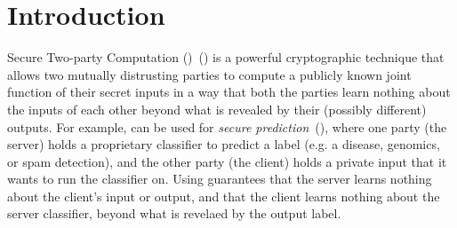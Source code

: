   
  

\section{Introduction}
\label{sec:intro}





Secure Two-party Computation (\mpc)~(\cite{yao,gmw}) is a powerful
cryptographic technique that allows two mutually distrusting parties
to compute a publicly known joint function of their secret inputs in a way that both
the parties learn nothing about the inputs of each other beyond what
is revealed by their (possibly different) outputs. For example, \mpc
can be used for {\em secure
prediction}~(\cite{shafindss,wu,barni,minionn,secureml}),
where one party (the server) holds a proprietary classifier to predict
a label (e.g. a disease, genomics, or spam detection), and the other
party (the client) holds a private input that it wants to run the
classifier on. Using \mpc guarantees that the server learns nothing
about the client's input or output, and that the client learns nothing
about the server classifier, beyond what is revelaed by the output
label.

